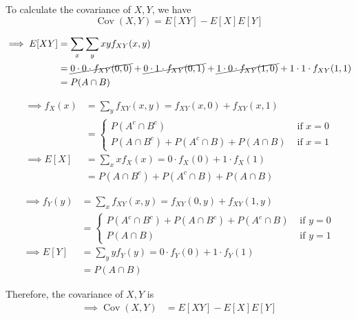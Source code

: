 To calculate the covariance of \( X, Y \), we have
\begin{equation*}
    \operatorname{Cov}(X, Y) = E[XY] - E[X]E[Y]
\end{equation*}

\begin{align*}
    \implies
    E[XY]
     & =
    \sum_{x} \sum_{y} xy f_{XY}(x, y)
    \\ & =
    \cancel{0 \cdot 0 \cdot f_{XY}(0, 0)}
    + \cancel{0 \cdot 1 \cdot f_{XY}(0, 1)}
    + \cancel{1 \cdot 0 \cdot f_{XY}(1, 0)}
    + 1 \cdot 1 \cdot f_{XY}(1, 1)
    \\ & =
    P(A \cap B)
\end{align*}

\begin{align*}
    \implies
    f_X (x)
     & =
    \sum_{y} f_{XY}(x, y)
    =
    f_{XY}(x, 0)
    + f_{XY}(x, 1)
    \\ & =
    \begin{cases}
        P(A^{c} \cap B^{c})
         &
        \text { if } x=0
        \\
        P(A \cap B^{c})
        + P(A^{c} \cap B)
        + P(A \cap B)
         &
        \text { if } x=1
    \end{cases}
    \\
    \implies
    E[X]
     & =
    \sum_{x} x f_X(x)
    =
    0 \cdot f_X(0)
    + 1 \cdot f_X(1)
    \\ & =
    P(A \cap B^{c})
    + P(A^{c} \cap B)
    + P(A \cap B)
\end{align*}

\begin{align*}
    \implies
    f_Y (y)
     & =
    \sum_{x} f_{XY}(x, y)
    =
    f_{XY}(0, y)
    + f_{XY}(1, y)
    \\ & =
    \begin{cases}
        P(A^{c} \cap B^{c})
        + P(A \cap B^{c})
        + P(A^{c} \cap B)
         &
        \text { if } y=0
        \\
        P(A \cap B)
         &
        \text { if } y=1
    \end{cases}
    \\
    \implies
    E[Y]
     & =
    \sum_{y} y f_Y(y)
    =
    0 \cdot f_Y(0) + 1 \cdot f_Y(1)
    \\ & =
    P(A \cap B)
\end{align*}

Therefore, the covariance of \( X, Y \) is
\begin{align*}
    \implies
    \operatorname{Cov}(X, Y)
     & =
    E[XY] - E[X]E[Y]
\end{align*}

